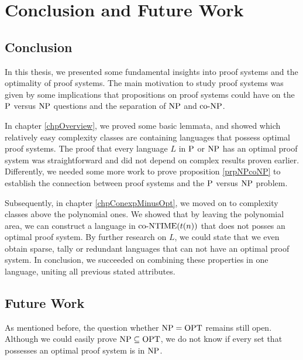 \chapter{Conclusion and Future Work}
  
  \section{Conclusion}
  
  In this thesis, we presented some fundamental insights into proof systems and the optimality of proof systems. The main motivation to study proof systems was given by some implications that propositions on proof systems could have on the \(\P\) versus \(\NP\) questions and the separation of \(\NP\) and \(\coNP\).
  
  In chapter \ref{chpOverview}, we proved some basic lemmata, and showed which relatively easy complexity classes are containing languages that possess optimal proof systems. The proof that every language \(L\) in \(\P\) or \(\NP\) has an optimal proof system was straightforward and did not depend on complex results proven earlier. Differently, we needed some more work to prove proposition \ref{prpNPcoNP} to establish the connection between proof systems and the \(\P\) versus \(\NP\) problem.
  
  Subsequently, in chapter \ref{chpConexpMinusOpt}, we moved on to complexity classes above the polynomial ones. We showed that by leaving the polynomial area, we can construct a language in \(\coNTIME(t(n))\) that does not posses an optimal proof system. By further research on \(L\), we could state that we even obtain sparse, tally or redundant languages that can not have an optimal proof system. In conclusion, we succeeded on combining these properties in one language, uniting all previous stated attributes.
  
  \section{Future Work}

  As mentioned before, the question whether \(\NP = \OPT\) remains still open. Although we could easily prove \(\NP \subseteq \OPT\), we do not know if every set that possesses an optimal proof system is in \(\NP\).
  